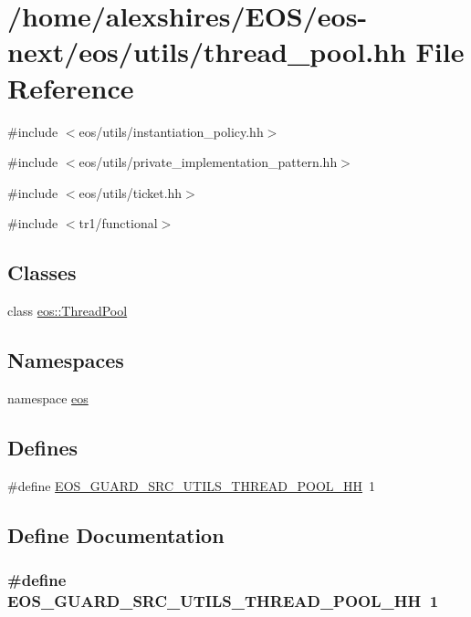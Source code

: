 \hypertarget{thread__pool_8hh}{
\section{/home/alexshires/EOS/eos-\/next/eos/utils/thread\_\-pool.hh File Reference}
\label{thread__pool_8hh}
}
{\ttfamily \#include $<$eos/utils/instantiation\_\-policy.hh$>$}\par
{\ttfamily \#include $<$eos/utils/private\_\-implementation\_\-pattern.hh$>$}\par
{\ttfamily \#include $<$eos/utils/ticket.hh$>$}\par
{\ttfamily \#include $<$tr1/functional$>$}\par
\subsection*{Classes}
\begin{DoxyCompactItemize}
\item 
class \hyperlink{classeos_1_1ThreadPool}{eos::ThreadPool}
\end{DoxyCompactItemize}
\subsection*{Namespaces}
\begin{DoxyCompactItemize}
\item 
namespace \hyperlink{namespaceeos}{eos}
\end{DoxyCompactItemize}
\subsection*{Defines}
\begin{DoxyCompactItemize}
\item 
\#define \hyperlink{thread__pool_8hh_a5a9d11a91405e6ce7d997b9e78f3cc40}{EOS\_\-GUARD\_\-SRC\_\-UTILS\_\-THREAD\_\-POOL\_\-HH}~1
\end{DoxyCompactItemize}


\subsection{Define Documentation}
\hypertarget{thread__pool_8hh_a5a9d11a91405e6ce7d997b9e78f3cc40}{
\subsubsection[{EOS\_\-GUARD\_\-SRC\_\-UTILS\_\-THREAD\_\-POOL\_\-HH}]{\setlength{\rightskip}{0pt plus 5cm}\#define EOS\_\-GUARD\_\-SRC\_\-UTILS\_\-THREAD\_\-POOL\_\-HH~1}}
\label{thread__pool_8hh_a5a9d11a91405e6ce7d997b9e78f3cc40}
